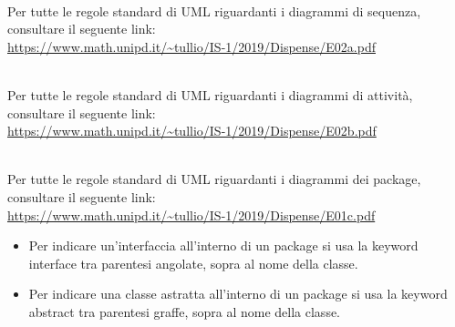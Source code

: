 \mbox{}\\
Per tutte le regole standard di UML riguardanti i diagrammi di sequenza, consultare il seguente link:
\\
\url{https://www.math.unipd.it/~tullio/IS-1/2019/Dispense/E02a.pdf}


 \mbox{}\\
Per tutte le regole standard di UML riguardanti i diagrammi di attività, consultare il seguente link:
\\ \url{https://www.math.unipd.it/~tullio/IS-1/2019/Dispense/E02b.pdf}

\mbox{}\\
Per tutte le regole standard di UML riguardanti i diagrammi dei package, consultare il seguente link: 
\\
\url{https://www.math.unipd.it/~tullio/IS-1/2019/Dispense/E01c.pdf}

\begin{itemize}
	\item Per indicare un'interfaccia all'interno di un package si usa la keyword interface tra parentesi angolate, sopra al nome della classe.
	\item Per indicare una classe astratta all'interno di un package si usa la keyword abstract tra parentesi graffe, sopra al nome della classe.
\end{itemize}
































